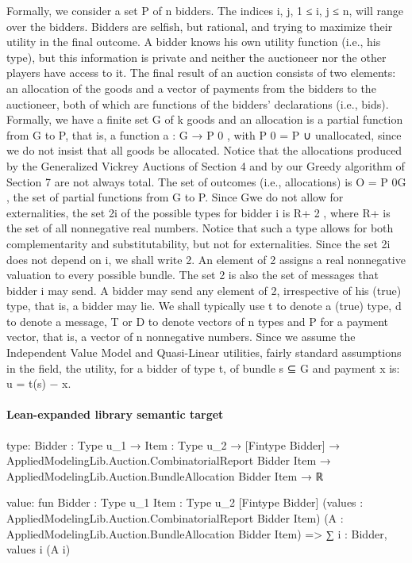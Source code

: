 \documentclass[10pt]{article}
\begin{document}
\begin{ReviewVerbatim}
Formally, we consider a set P of n bidders. The indices i, j, 1 ≤ i, j ≤ n, will
range over the bidders. Bidders are selfish, but rational, and trying to maximize their
utility in the final outcome. A bidder knows his own utility function (i.e., his type),
but this information is private and neither the auctioneer nor the other players have
access to it. The final result of an auction consists of two elements: an allocation
of the goods and a vector of payments from the bidders to the auctioneer, both of
which are functions of the bidders’ declarations (i.e., bids). Formally, we have a
finite set G of k goods and an allocation is a partial function from G to P, that is, a
function a : G → P 0 , with P 0 = P ∪ {unallocated}, since we do not insist that all
goods be allocated. Notice that the allocations produced by the Generalized Vickrey
Auctions of Section 4 and by our Greedy algorithm of Section 7 are not always
total. The set of outcomes (i.e., allocations) is O = P 0G , the set of partial functions
from G to P. Since Gwe do not allow for externalities, the set 2i of the possible types
for bidder i is R+ 2 , where R+ is the set of all nonnegative real numbers. Notice
that such a type allows for both complementarity and substitutability, but not for
externalities. Since the set 2i does not depend on i, we shall write 2. An element
of 2 assigns a real nonnegative valuation to every possible bundle. The set 2 is
also the set of messages that bidder i may send. A bidder may send any element of
2, irrespective of his (true) type, that is, a bidder may lie. We shall typically use t
to denote a (true) type, d to denote a message, T or D to denote vectors of n types
and P for a payment vector, that is, a vector of n nonnegative numbers.
Since we assume the Independent Value Model and Quasi-Linear utilities, fairly
standard assumptions in the field, the utility, for a bidder of type t, of bundle s ⊆ G
and payment x is:
u = t(s) − x.
\end{ReviewVerbatim}



\paragraph{Lean-expanded library semantic target}
\begin{ReviewVerbatim}
type:
{Bidder : Type u_1} →
  {Item : Type u_2} →
    [Fintype Bidder] →
      AppliedModelingLib.Auction.CombinatorialReport Bidder Item →
        AppliedModelingLib.Auction.BundleAllocation Bidder Item → ℝ

value:
fun {Bidder : Type u_1} {Item : Type u_2} [Fintype Bidder]
    (values : AppliedModelingLib.Auction.CombinatorialReport Bidder Item)
    (A : AppliedModelingLib.Auction.BundleAllocation Bidder Item) =>
  ∑ i : Bidder, values i (A i)
\end{ReviewVerbatim}
\end{document}
